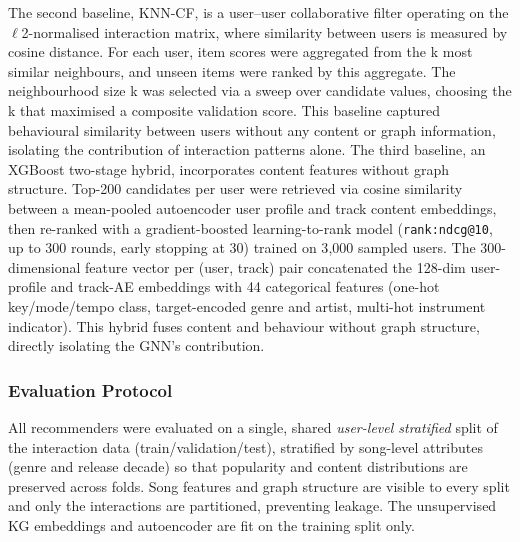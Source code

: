 The second baseline, KNN-CF, is a user–user collaborative filter operating on the $\ell$2-normalised interaction matrix, where similarity between users is measured by cosine distance. For each user, item scores were aggregated from the k most similar neighbours, and unseen items were ranked by this aggregate. The neighbourhood size k was selected via a sweep over candidate values, choosing the k that maximised a composite validation score. This baseline captured behavioural similarity between users without any content or graph information, isolating the contribution of interaction patterns alone.
The third baseline, an XGBoost two-stage hybrid, incorporates content features without graph structure. Top-200 candidates per user were retrieved via cosine similarity between a mean-pooled autoencoder user profile and track content embeddings, then re-ranked with a gradient-boosted learning-to-rank model (\texttt{rank:ndcg@10}, up to 300 rounds, early stopping at 30) trained on 3{,}000 sampled users. The 300-dimensional feature vector per (user, track) pair concatenated the 128-dim user-profile and track-AE embeddings with 44 categorical features (one-hot key/mode/tempo class, target-encoded genre and artist, multi-hot instrument indicator). This hybrid fuses content and behaviour without graph structure, directly isolating the GNN's contribution.

\subsubsection{Evaluation Protocol}

All recommenders were evaluated on a single, shared \emph{user-level
stratified} split of the interaction data (train/validation/test),
stratified by song-level attributes (genre and release decade) so that
popularity and content distributions are preserved across folds. Song
features and graph structure are visible to every split and only the
interactions are partitioned, preventing leakage. The unsupervised KG
embeddings and autoencoder are fit on the training split only.

